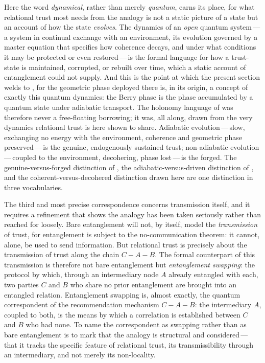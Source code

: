 Here the word \emph{dynamical}, rather than merely \emph{quantum}, earns its place, for what relational trust most needs from the analogy is not a static picture of a state but an account of how the state \emph{evolves}. The dynamics of an \emph{open} quantum system\,---\,a system in continual exchange with an environment, its evolution governed by a master equation that specifies how coherence decays, and under what conditions it may be protected or even restored\,---\,is the formal language for how a trust-state is maintained, corrupted, or rebuilt over time, which a static account of entanglement could not supply. And this is the point at which the present section welds to , for the geometric phase deployed there is, in its origin, a concept of exactly this quantum dynamics: the Berry phase is the phase accumulated by a quantum state under adiabatic transport. The holonomy language of  was therefore never a free-floating borrowing; it was, all along, drawn from the very dynamics relational trust is here shown to share. Adiabatic evolution\,---\,slow, exchanging no energy with the environment, coherence and geometric phase preserved\,---\,is the genuine, endogenously sustained trust; non-adiabatic evolution\,---\,coupled to the environment, decohering, phase lost\,---\,is the forged. The genuine-versus-forged distinction of , the adiabatic-versus-driven distinction of , and the coherent-versus-decohered distinction drawn here are one distinction in three vocabularies.

The third and most precise correspondence concerns transmission itself, and it requires a refinement that shows the analogy has been taken seriously rather than reached for loosely. Bare entanglement will not, by itself, model the \emph{transmission} of trust, for entanglement is subject to the no-communication theorem: it cannot, alone, be used to send information. But relational trust is precisely about the transmission of trust along the chain $C\!-\!A\!-\!B$. The formal counterpart of this transmission is therefore not bare entanglement but \emph{entanglement swapping}: the protocol by which, through an intermediary node $A$ already entangled with each, two parties $C$ and $B$ who share no prior entanglement are brought into an entangled relation. Entanglement swapping is, almost exactly, the quantum correspondent of the recommendation mechanism $C\!-\!A\!-\!B$: the intermediary $A$, coupled to both, is the means by which a correlation is established between $C$ and $B$ who had none. To name the correspondent as swapping rather than as bare entanglement is to mark that the analogy is structural and considered\,---\,that it tracks the specific feature of relational trust, its transmissibility through an intermediary, and not merely its non-locality.

